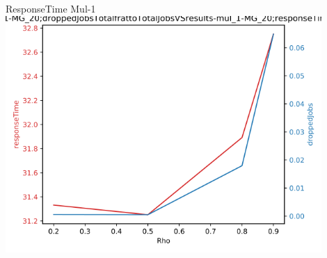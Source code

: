 \documentclass[a4paper]{article}
\begin{document}
\begin{center}
ResponseTime Mul-1 \\
\includegraphics[width=0.9\textwidth]{droppedJobsVSresponseTime-Mul_1-MG_20.png}
\end{center}
\end{document}
